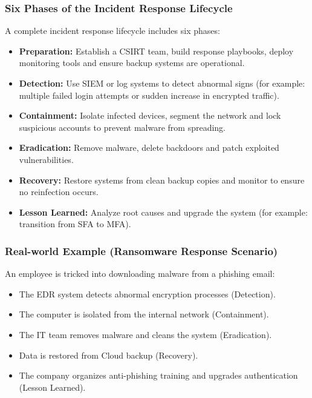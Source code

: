 \subsubsection{Six Phases of the Incident Response Lifecycle}

A complete incident response lifecycle includes six phases:

\begin{itemize}
    \item \textbf{Preparation:} Establish a CSIRT team, build response playbooks, deploy monitoring tools and ensure backup systems are operational.
    
    \item \textbf{Detection:} Use SIEM or log systems to detect abnormal signs (for example: multiple failed login attempts or sudden increase in encrypted traffic).
    
    \item \textbf{Containment:} Isolate infected devices, segment the network and lock suspicious accounts to prevent malware from spreading.
    
    \item \textbf{Eradication:} Remove malware, delete backdoors and patch exploited vulnerabilities.
    
    \item \textbf{Recovery:} Restore systems from clean backup copies and monitor to ensure no reinfection occurs.
    
    \item \textbf{Lesson Learned:} Analyze root causes and upgrade the system (for example: transition from SFA to MFA).
\end{itemize}

\subsubsection{Real-world Example (Ransomware Response Scenario)}

An employee is tricked into downloading malware from a phishing email:

\begin{itemize}
    \item The EDR system detects abnormal encryption processes (Detection).
    \item The computer is isolated from the internal network (Containment).
    \item The IT team removes malware and cleans the system (Eradication).
    \item Data is restored from Cloud backup (Recovery).
    \item The company organizes anti-phishing training and upgrades authentication (Lesson Learned).
\end{itemize}

